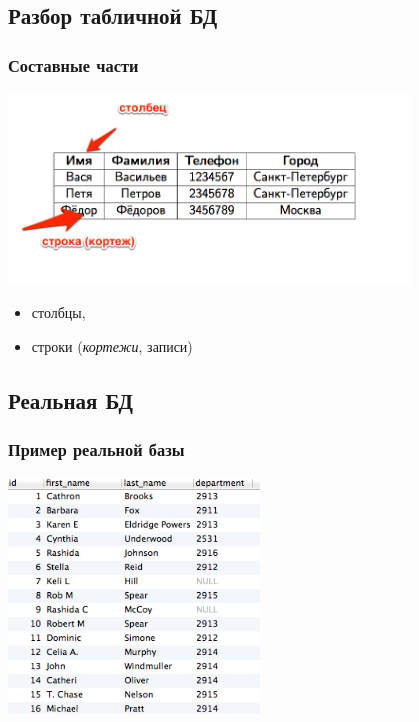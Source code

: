 \documentclass[compress,red]{beamer}
\begin{document}
\subsection{Разбор табличной БД}
\begin{frame}[fragile]
  \frametitle{Составные части}
  \centerline{\includegraphics[width=0.8\textwidth]{images/database_part1.png}}
  \begin{itemize}
    \item столбцы,
    \item строки (\emph{кортежи}, записи)
  \end{itemize}
\end{frame}

\subsection{Реальная БД}
\begin{frame}[fragile]
  \frametitle{Пример реальной базы}
  \centerline{\includegraphics[width=0.5\textwidth]{images/database_part2.png}}
\end{frame}
\end{document}
